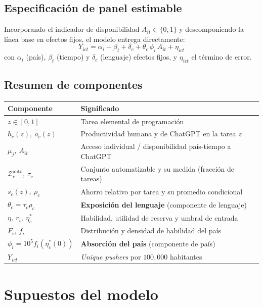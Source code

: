 \documentclass[11pt,a4paper]{article}
\newcommand{\Zauto}{\mathcal{Z}^{\mathrm{auto}}_c}
\begin{document}
\subsection{Especificación de panel estimable}

Incorporando el indicador de disponibilidad $A_{it}\in\{0,1\}$ y descomponiendo la línea base en efectos fijos, el modelo entrega directamente:
\[
\boxed{\;Y_{ict}=\alpha_i+\beta_t+\delta_c+\theta_c\,\phi_i\,A_{it}+\eta_{ict}\;}
\]
con $\alpha_i$ (país), $\beta_t$ (tiempo) y $\delta_c$ (lenguaje) efectos fijos, y $\eta_{ict}$ el término de error.

\subsection{Resumen de componentes}

\renewcommand{\arraystretch}{1.25}
\begin{center}
\small
\begin{tabular}{ll}
\toprule
\textbf{Componente} & \textbf{Significado} \\
\midrule
$z\in[0,1]$ & Tarea elemental de programación \\
$h_c(z),\ a_c(z)$ & Productividad humana y de ChatGPT en la tarea $z$ \\
$\mu_j,\ A_{it}$ & Acceso individual / disponibilidad país-tiempo a ChatGPT \\
$\Zauto,\ \tau_c$ & Conjunto automatizable y su medida (fracción de tareas) \\
$s_c(z),\ \rho_c$ & Ahorro relativo por tarea y su promedio condicional \\
$\theta_c=\tau_c\rho_c$ & \textbf{Exposición del lenguaje} (componente de lenguaje) \\
$\eta,\ r_i,\ \eta_c^*$ & Habilidad, utilidad de reserva y umbral de entrada \\
$F_i,\ f_i$ & Distribución y densidad de habilidad del país \\
$\phi_i=10^5 f_i(\eta_c^*(0))$ & \textbf{Absorción del país} (componente de país) \\
$Y_{ict}$ & \textit{Unique pushers} por $100{,}000$ habitantes \\
\bottomrule
\end{tabular}
\end{center}

\section{Supuestos del modelo}
\end{document}
